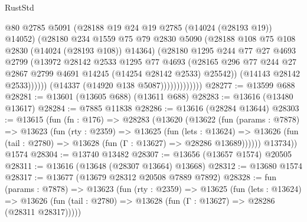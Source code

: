 \begin{lexlean}{RustStd}
\begin{coremodule}
                                @80
                                @2785
                                @5091
                                (@28188 @19 @24 @19 @2785 (@14024 (@28193 @19)) @14052)
                                (@28180
                                  @234
                                  @1559
                                  @75
                                  @79
                                  @2830
                                  @5090
                                  (@28188 @108 @75 @108 @2830 (@14024 (@28193 @108)) @14364)
                                  (@28180
                                    @1295
                                    @244
                                    @77
                                    @27
                                    @4693
                                    @2799
                                    (@13972
                                      @28142
                                      @2533
                                      @1295
                                      @77
                                      @4693
                                      (@28165
                                        @296
                                        @77
                                        @244
                                        @27
                                        @2867
                                        @2799
                                        @4691
                                        @14245
                                        (@14254 @28142 @2533)
                                        @25542))
                                    (@14143 @28142 @2533))))))
                          (@14337 (@14920 @138 @5087)))))))))))))
@28277 := @13599 @688
@28281 := @13601 (@13605 @688) (@13611 @688)
@28283 := @13616 (@13480 @13617)
@28284 := @7885 @11838
@28286 := @13616 (@28284 @13644)
@28303 := @13615
    (fun (fn : @176) =>
    @28283
      (@13620
        (@13622
          (fun (params : @7878) =>
          @13623
            (fun (rty : @2359) =>
            @13625
              (fun (lets : @13624) =>
              @13626 (fun (tail : @2780) => @13628 (fun (Γ : @13627) => @28286 @13689))))))
        @13734))
    @1574
@28304 := @13740 @13482
@28307 := @13656 (@13657 @1574) @20505
@28311 := @13616 (@13648 (@28307 @13664) @13668)
@28312 := @13680 @1574
@28317 := @13677 (@13679 @28312 @20508 @7889 @7892)
@28328 := fun (params : @7878) =>
  @13623
    (fun (rty : @2359) =>
    @13625
      (fun (lets : @13624) =>
      @13626 (fun (tail : @2780) => @13628 (fun (Γ : @13627) => @28286 (@28311 @28317)))))

\end{coremodule}
\end{lexlean}
